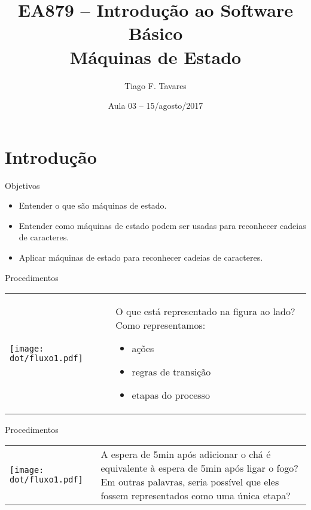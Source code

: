 \documentclass{beamer}
\title[03-Arquiteturas]{EA879 -- Introdução ao Software Básico\\Máquinas de
Estado}
\author{Tiago F. Tavares}
\institute{FEEC -- UNICAMP}
\date{Aula 03 -- 15/agosto/2017}
\begin{document}
\begin{frame}
  \titlepage
\end{frame}


\section{Introdução}

\begin{frame}{Objetivos}
  \Large
  \begin{itemize}
    \item Entender o que são máquinas de estado.
    \item Entender como máquinas de estado podem ser usadas para reconhecer
      cadeias de caracteres.
    \item Aplicar máquinas de estado para reconhecer cadeias de caracteres.
  \end{itemize}
\end{frame}

\begin{frame}{Procedimentos}
  \centering
  \begin{tabular}{l m{6cm}}
    \begin{minipage}{.3\textwidth}
  \texttt{[image: dot/fluxo1.pdf]}
    \end{minipage}
  &
  O que está representado na figura ao lado? Como representamos:
    \begin{itemize}
  \item ações
  \item regras de transição
  \item etapas do processo
    \end{itemize}
  \\
  \end{tabular}
\end{frame}

\begin{frame}{Procedimentos}
  \centering
  \Large
  \begin{tabular}{l m{6cm}}
    \begin{minipage}{.3\textwidth}
  \texttt{[image: dot/fluxo1.pdf]}
    \end{minipage}
  &
    A espera de 5min após adicionar o chá é equivalente à espera de 5min após
    ligar o fogo? Em outras palavras, seria possível que eles fossem
    representados como uma única etapa?
    \\
  \end{tabular}
\end{frame}
\end{document}
